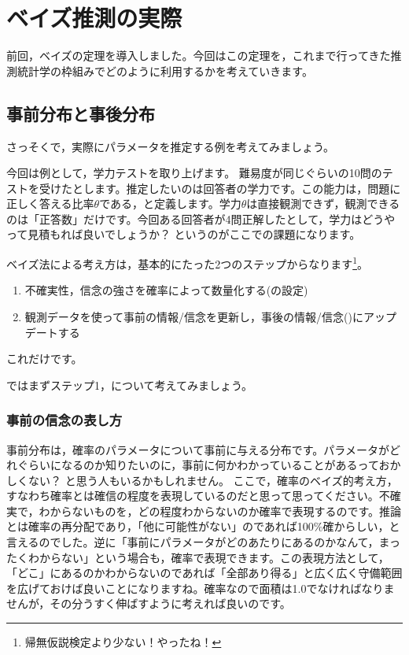 \documentclass{ltjsbook}
\begin{document}
\VerbatimFootnotes
\chapter{ベイズ推測の実際}
\label{m26_bayesian2}
前回，ベイズの定理を導入しました。今回はこの定理を，これまで行ってきた推測統計学の枠組みでどのように利用するかを考えていきます。


\section{事前分布と事後分布}
さっそくで，実際にパラメータを推定する例を考えてみましょう。

今回は例として，学力テストを取り上げます。
難易度が同じぐらいの10問のテストを受けたとします。推定したいのは回答者の学力です。この能力は，問題に正しく答える比率$\theta$である，と定義します。学力$\theta$は直接観測できず，観測できるのは「正答数」だけです。今回ある回答者が4問正解したとして，学力はどうやって見積もれば良いでしょうか？ というのがここでの課題になります。

ベイズ法による考え方は，基本的にたった2つのステップからなります\footnote{帰無仮説検定より少ない！やったね！}。
\begin{enumerate}
	\item 不確実性，信念の強さを確率によって数量化する(の設定)
	\item 観測データを使って事前の情報/信念を更新し，事後の情報/信念()にアップデートする
\end{enumerate}
これだけです。

ではまずステップ1，について考えてみましょう。
\subsection{事前の信念の表し方}
事前分布は，確率のパラメータについて事前に与える分布です。パラメータがどれぐらいになるのか知りたいのに，事前に何かわかっていることがあるっておかしくない？ と思う人もいるかもしれません。
ここで，確率のベイズ的考え方，すなわち確率とは確信の程度を表現しているのだと思って思ってください。不確実で，わからないものを，どの程度わからないのか確率で表現するのです。推論とは確率の再分配であり，「他に可能性がない」のであれば100\%確からしい，と言えるのでした。逆に「事前にパラメータがどのあたりにあるのかなんて，まったくわからない」という場合も，確率で表現できます。この表現方法として，「どこ」にあるのかわからないのであれば「全部あり得る」と広く広く守備範囲を広げておけば良いことになりますね。確率なので面積は1.0でなければなりませんが，その分うすく伸ばすように考えれば良いのです。
\end{document}
